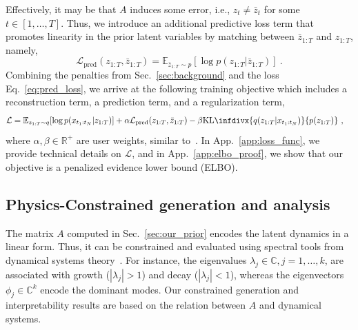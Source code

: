 \documentclass{article} %
\newcommand{\kldiv}{\text{KL}\infdivx}
\begin{document}
Effectively, it may be that $A$ induces some error, i.e., $z_t \neq \bar{z}_t$ for some $t \in [1, \dots, T]$. Thus, we introduce an additional predictive loss term that promotes linearity in the prior latent variables by matching between $\bar{z}_{1:T}$ and $z_{1:T}$, namely, 
\begin{equation} \label{eq:pred_loss}
    \mathcal{L}_\text{pred}(z_{1:T}, \bar{z}_{1:T}) = \mathbb{E}_{\bar{z}_{1:T} \sim p} [\log p(z_{1:T} | \bar{z}_{1:T})] \ .
\end{equation}
Combining the penalties from Sec.~\ref{sec:background} and the loss Eq.~\ref{eq:pred_loss}, we arrive at the following training objective which includes a reconstruction term, a prediction term, and a regularization term,
\begin{equation} \label{eq:vkae_loss}
\begin{aligned}
    \mathcal{L} &= \mathbb{E}_{z_{1:T} \sim q}[\log p(x_{t_1:t_N} | z_{1:T})] + \alpha \mathcal{L}_\text{pred}(z_{1:T}, \bar{z}_{1:T}) -\beta \kldiv{q(z_{1:T}| x_{t_1:t_N})}{p(z_{1:T})} \ ,
\end{aligned}
\end{equation}
where $\alpha, \beta \in \mathbb{R}^+$ are user weights, similar to~\citep{higgins2016beta}. In App.~\ref{app:loss_func}, we provide technical details on $\mathcal{L}$, and in App.~\ref{app:elbo_proof}, we show that our objective is a penalized evidence lower bound (ELBO).

\subsection{Physics-Constrained generation and analysis}
\label{sec:our_features}

The matrix $A$ computed in Sec.~\ref{sec:our_prior} encodes the latent dynamics in a linear form. Thus, it can be constrained and evaluated using spectral tools from dynamical systems theory~\citep{strogatz2018nonlinear}. For instance, the eigenvalues $\lambda_j \in \mathbb{C}, j=1,\dots,k$, are associated with growth ($|\lambda_j| > 1$) and decay ($|\lambda_j| < 1$), whereas the eigenvectors $\phi_j \in \mathbb{C}^k$ encode the dominant modes. Our constrained generation and interpretability results are based on the relation between $A$ and dynamical systems.
\end{document}
